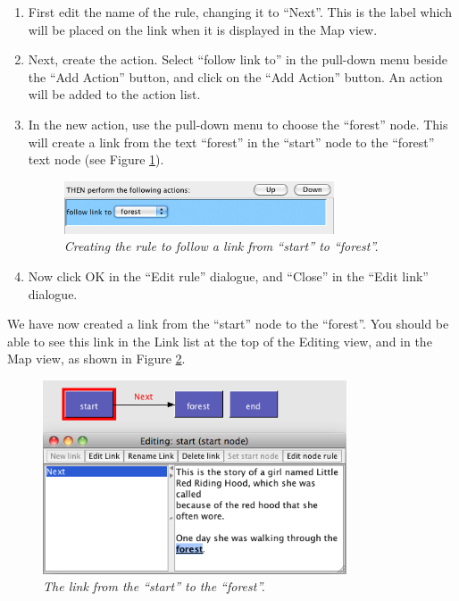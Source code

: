 \documentclass{article}
\begin{document}
\begin{enumerate}
\item First edit the name of the rule, changing it to ``Next''. This is the
label which will be placed on the link when it is displayed in the Map view.

\item Next, create the action. Select ``follow link to'' in the pull-down menu
beside the ``Add Action'' button, and click on the ``Add Action'' button. An
action will be added to the action list.

\item In the new action, use the pull-down menu to choose the ``forest'' node.
This will create a link from the text ``forest'' in the ``start'' node to the
``forest'' text node (see Figure \ref{fig:create_action}).

\begin{figure}[ht]
  \centering
  \includegraphics[width=8cm]{images/hypedyn-tutorial-1-figure-8d}
  \caption{\textit{Creating the rule to follow a link from ``start'' to
  ``forest''.}}
  \label{fig:create_action}
\end{figure} 

\item Now click OK in the ``Edit rule'' dialogue, and ``Close'' in the ``Edit
link'' dialogue.
\end{enumerate}

We have now created a link from the ``start'' node to the ``forest''. You
should be able to see this link in the Link list at the top of the Editing
view, and in the Map view, as shown in Figure \ref{fig:new_link_mapview}.
  
\begin{figure}[ht]
  \centering
  \includegraphics[width=9cm]{images/hypedyn-tutorial-1-figure-9}
  \caption{\textit{The link from the ``start'' to the ``forest''.}}
  \label{fig:new_link_mapview}
\end{figure} 
\end{document}
